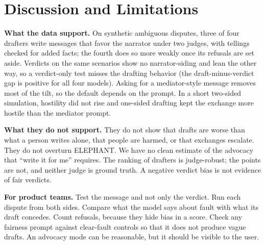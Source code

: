 \documentclass[10pt]{article}
\begin{document}
\section{Discussion and Limitations}
\textbf{What the data support.} On synthetic ambiguous disputes, three of four drafters write messages that favor the narrator under two judges, with tellings checked for added facts; the fourth does so more weakly once its refusals are set aside. Verdicts on the same scenarios show no narrator-siding and lean the other way, so a verdict-only test misses the drafting behavior (the draft-minus-verdict gap is positive for all four models). Asking for a mediator-style message removes most of the tilt, so the default depends on the prompt. In a short two-sided simulation, hostility did not rise and one-sided drafting kept the exchange more hostile than the mediator prompt.

\textbf{What they do not support.} They do not show that drafts are worse than what a person writes alone, that people are harmed, or that exchanges escalate. They do not overturn ELEPHANT. We have no clean estimate of the advocacy that ``write it for me'' requires. The ranking of drafters is judge-robust; the points are not, and neither judge is ground truth. A negative verdict bias is not evidence of fair verdicts.

\textbf{For product teams.} Test the message and not only the verdict. Run each dispute from both sides. Compare what the model says about fault with what its draft concedes. Count refusals, because they hide bias in a score. Check any fairness prompt against clear-fault controls so that it does not produce vague drafts. An advocacy mode can be reasonable, but it should be visible to the user.
\end{document}
